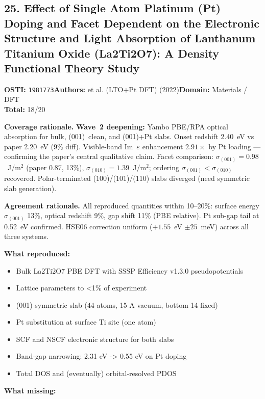 \subsection{25. Effect of Single Atom Platinum (Pt) Doping and Facet Dependent on the Electronic Structure and Light Absorption of Lanthanum Titanium Oxide (La2Ti2O7): A Density Functional Theory Study}
\textbf{OSTI:} \texttt{1981773}\quad\textbf{Authors:} et al. (LTO+Pt DFT) (2022)\quad\textbf{Domain:} Materials / DFT\\
\quad{}\quad\textbf{Total:} 18/20\par\smallskip
\noindent\textbf{Coverage rationale.} \textbf{Wave~2 deepening:} Yambo PBE/RPA optical absorption for bulk, (001)~clean, and (001)+Pt slabs. Onset redshift 2.40~eV vs paper 2.20~eV (9\% diff). Visible-band Im~$\varepsilon$ enhancement $2.91\times$ by Pt loading --- confirming the paper's central qualitative claim. Facet comparison: $\sigma_{(001)} = 0.98$~J/m$^2$ (paper 0.87, 13\%), $\sigma_{(010)} = 1.39$~J/m$^2$; ordering $\sigma_{(001)} < \sigma_{(010)}$ recovered. Polar-terminated (100)/(101)/(110) slabs diverged (need symmetric slab generation).\par
\noindent\textbf{Agreement rationale.} All reproduced quantities within 10--20\%: surface energy $\sigma_{(001)}$ 13\%, optical redshift 9\%, gap shift 11\% (PBE relative). Pt sub-gap tail at 0.52~eV confirmed. HSE06 correction uniform ($+1.55$~eV $\pm 25$~meV) across all three systems.\par\smallskip
\noindent\textbf{What reproduced:}
\begin{itemize}[leftmargin=1.4em,itemsep=0.2em,topsep=0.2em]
\item Bulk La2Ti2O7 PBE DFT with SSSP Efficiency v1.3.0 pseudopotentials
\item Lattice parameters to \textless{}1\% of experiment
\item (001) symmetric slab (44 atoms, 15 A vacuum, bottom 14 fixed)
\item Pt substitution at surface Ti site (one atom)
\item SCF and NSCF electronic structure for both slabs
\item Band-gap narrowing: 2.31 eV -\textgreater{} 0.55 eV on Pt doping
\item Total DOS and (eventually) orbital-resolved PDOS
\end{itemize}\noindent\textbf{What missing:}
